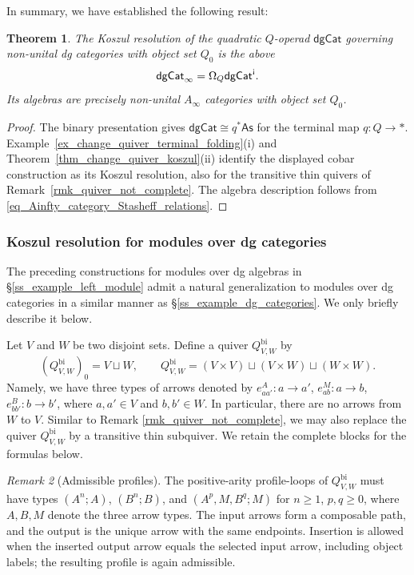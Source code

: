 \documentclass[11pt,letterpaper]{article}
\numberwithin{equation}{section}
\theoremstyle{plain}
\newtheorem{thm}{Theorem}[section]
\theoremstyle{definition}
\theoremstyle{remark}
\newtheorem{rmk}[thm]{Remark}
\newcommand{\antishriek}{%
	\mathord{\mathchoice
		{\rotatebox[origin=c]{180}{$\displaystyle !$}}
		{\rotatebox[origin=c]{180}{$\textstyle !$}}
		{\rotatebox[origin=c]{180}{$\scriptstyle !$}}
		{\rotatebox[origin=c]{180}{$\scriptscriptstyle !$}}}}
\begin{document}
	In summary, we have established the following result:

	\begin{thm}
		\label{thm_dgCat_resolution_AinftyCat}
		The Koszul resolution of the quadratic $Q$-operad
		$\mathsf{dgCat}$ governing non-unital dg categories with object set
		$Q_0$ is the above
		\[
		\mathsf{dgCat}_\infty
		=
		\Omega_Q\mathsf{dgCat}^{\antishriek}.
		\]
		Its algebras are precisely non-unital $A_\infty$ categories with object set $Q_0$.
	\end{thm}
\begin{proof}
The binary presentation gives $\mathsf{dgCat}\cong q^*\mathsf{As}$
for the terminal map $q:Q\to\ast$.
Example~\ref{ex_change_quiver_terminal_folding}(i) and
Theorem~\ref{thm_change_quiver_koszul}(ii) identify the displayed
cobar construction as its Koszul resolution, also for the transitive
thin quivers of Remark~\ref{rmk_quiver_not_complete}.
The algebra description follows from
\eqref{eq_Ainfty_category_Stasheff_relations}.
\end{proof}

	\subsubsection{Koszul resolution for modules over dg categories}
	\label{sss_dg_category_bimodules}
	The preceding constructions for modules over dg algebras in \S \ref{ss_example_left_module} admit a natural generalization to modules over dg categories in a similar manner as \S \ref{ss_example_dg_categories}.  We only briefly describe it below.

	Let $V$ and $W$ be two disjoint sets.  Define a quiver
	$Q^{\mathrm{bi}}_{V,W}$ by
	\[
	\left(Q^{\mathrm{bi}}_{V,W}\right)_0=V\sqcup W,
	\qquad
	Q^{\mathrm{bi}}_{V,W}
	=
	(V\times V)\sqcup(V\times W)\sqcup(W\times W).
	\]
	Namely, we have three types of arrows denoted by
	$e^A_{aa'}:a \to a'$, $e^M_{ab}:a\to  b$, $e^B_{bb'}:b\to  b'$, where $a,a'\in V$ and $b,b'\in W$.
	In particular, there are no arrows
	from $W$ to $V$.
	Similar to Remark \ref{rmk_quiver_not_complete}, we may also replace the quiver \(Q^{\mathrm{bi}}_{V,W}\) by a transitive thin subquiver. We retain the complete blocks for the formulas below.

	\begin{rmk}[Admissible profiles]\label{rmk_bimodule_admissible_profiles}
	The positive-arity profile-loops of $Q^{\mathrm{bi}}_{V,W}$ must have types
	$ (A^n;A)$, $(B^n;B)$, and $(A^p,M,B^q;M)$ for
	 $n\ge1$, $p,q\ge0$,
	where $A,B,M$ denote the three arrow types. The input arrows form
	a composable path, and the output is the unique arrow with the same
	endpoints. Insertion is allowed when the inserted output arrow equals
	the selected input arrow, including object labels; the resulting
	profile is again admissible.
	\end{rmk}
\end{document}
